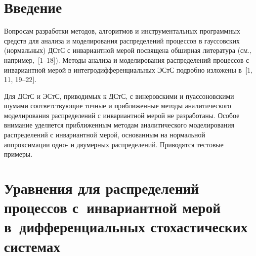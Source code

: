 

      \thispagestyle{headings}

      \begin{multicols}{2}

            \label{st\stat}


\section{Введение}


Вопросам разработки методов, алгоритмов и инструментальных
программных средств для анализа и моделирования  распределений
процессов в гауссовских (нормальных) ДСтС с инвариантной мерой
посвящена обширная литература (см., например,~[1--18]).
Методы анализа и моделирования распределений процессов с
инвариантной мерой в интегродифференциальных ЭСтС
подробно изложены в~[1, 11, 19--22].

Для ДСтС и ЭСтС, приводимых к ДСтС, с винеров\-скими и пуассоновскими
шумами соответствующие точные и приближенные методы аналитического
моделирования распределений с инвариантной мерой не разработаны.
Особое внимание уделяется приближенным методам аналитического
моделирования распределений с инвариантной мерой, основанным на
нормальной аппроксимации одно- и двумерных распределений.
Приводятся тестовые примеры.

\section{Уравнения для распределений процессов с~инвариантной мерой в~дифференциальных
стохастических системах}


\end{multicols}
